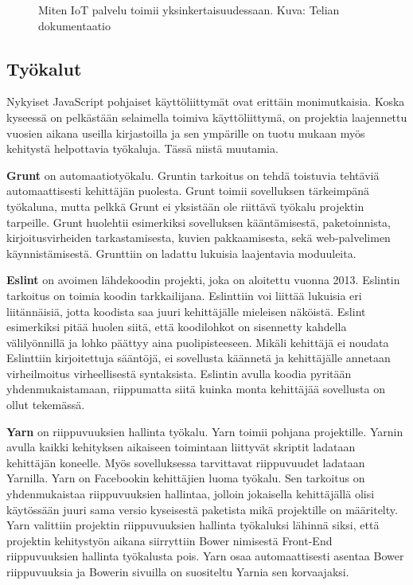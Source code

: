 \documentclass{tktltiki}
\begin{document}
\begin{figure}[h]
\begin{center}
\caption{Miten IoT palvelu toimii yksinkertaisuudessaan. Kuva: Telian dokumentaatio}
\label{IoT arkkitehtuuri}
\end{center}
\end{figure}

\subsection{Työkalut}

Nykyiset JavaScript pohjaiset käyttöliittymät ovat erittäin monimutkaisia. Koska kyseessä on pelkästään selaimella toimiva käyttöliittymä, on projektia laajennettu vuosien aikana useilla kirjastoilla ja sen ympärille on tuotu mukaan myös kehitystä helpottavia työkaluja. Tässä niistä muutamia. 

\textbf{Grunt} on automaatiotyökalu. Gruntin tarkoitus on tehdä toistuvia tehtäviä automaattisesti kehittäjän puolesta. Grunt toimii sovelluksen tärkeimpänä työkaluna, mutta pelkkä Grunt ei yksistään ole riittävä työkalu projektin tarpeille. Grunt huolehtii esimerkiksi sovelluksen kääntämisestä, paketoinnista, kirjoitusvirheiden tarkastamisesta, kuvien pakkaamisesta, sekä web-palvelimen käynnistämisestä. Grunttiin on ladattu lukuisia laajentavia moduuleita.

\textbf{Eslint} on avoimen lähdekoodin projekti, joka on aloitettu vuonna 2013. Eslintin tarkoitus on toimia koodin tarkkailijana. Eslinttiin voi liittää lukuisia eri liitännäisiä, jotta koodista saa juuri kehittäjälle mieleisen näköistä. Eslint esimerkiksi pitää huolen siitä, että koodilohkot on sisennetty kahdella välilyönnillä ja lohko päättyy aina puolipisteeseen. Mikäli kehittäjä ei noudata Eslinttiin kirjoitettuja sääntöjä, ei sovellusta käännetä ja kehittäjälle annetaan virheilmoitus virheellisestä syntaksista. Eslintin avulla koodia pyritään yhdenmukaistamaan, riippumatta siitä kuinka monta kehittäjää sovellusta on ollut tekemässä. 

\textbf{Yarn} on riippuvuuksien hallinta työkalu. Yarn toimii pohjana projektille. Yarnin avulla kaikki kehityksen aikaiseen toimintaan liittyvät skriptit ladataan kehittäjän koneelle. Myös sovelluksessa tarvittavat riippuvuudet ladataan Yarnilla. Yarn on Facebookin kehittäjien luoma työkalu. Sen tarkoitus on yhdenmukaistaa riippuvuuksien hallintaa, jolloin jokaisella kehittäjällä olisi käytössään juuri sama versio kyseisestä paketista mikä projektille on määritelty. Yarn valittiin projektin riippuvuuksien hallinta työkaluksi lähinnä siksi, että projektin kehitystyön aikana siirryttiin Bower nimisestä Front-End riippuvuuksien hallinta työkalusta pois. Yarn osaa automaattisesti asentaa Bower riippuvuuksia ja Bowerin sivuilla on suositeltu Yarnia sen korvaajaksi.
\end{document}
